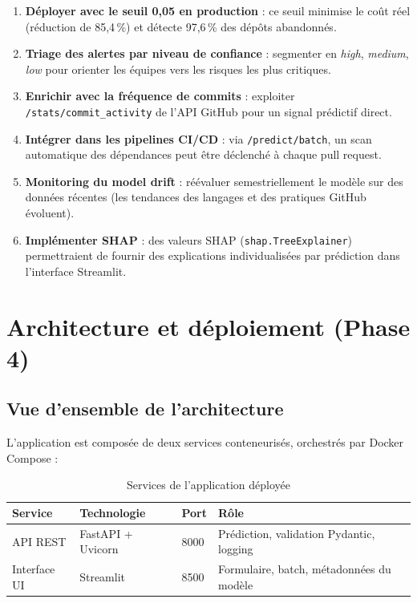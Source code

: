 \documentclass[12pt,a4paper]{article}
\begin{document}
\begin{enumerate}[label=\textbf{R\arabic*.}]
  \item \textbf{Déployer avec le seuil 0,05 en production} : ce seuil minimise le coût réel
    (réduction de 85,4\,\%) et détecte 97,6\,\% des dépôts abandonnés.
  \item \textbf{Triage des alertes par niveau de confiance} : segmenter en \textit{high},
    \textit{medium}, \textit{low} pour orienter les équipes vers les risques les plus critiques.
  \item \textbf{Enrichir avec la fréquence de commits} : exploiter \texttt{/stats/commit\_activity}
    de l'API GitHub pour un signal prédictif direct.
  \item \textbf{Intégrer dans les pipelines CI/CD} : via \texttt{/predict/batch}, un scan
    automatique des dépendances peut être déclenché à chaque pull request.
  \item \textbf{Monitoring du model drift} : réévaluer semestriellement le modèle sur des
    données récentes (les tendances des langages et des pratiques GitHub évoluent).
  \item \textbf{Implémenter SHAP} : des valeurs SHAP (\texttt{shap.TreeExplainer}) permettraient
    de fournir des explications individualisées par prédiction dans l'interface Streamlit.
\end{enumerate}

\newpage
\section{Architecture et déploiement (Phase 4)}

\subsection{Vue d'ensemble de l'architecture}

L'application est composée de deux services conteneurisés, orchestrés par Docker Compose :

\begin{table}[H]
  \centering
  \caption{Services de l'application déployée}
  \label{tab:services}
  \begin{tabularx}{\linewidth}{lllL}
    \toprule
    \textbf{Service} & \textbf{Technologie} & \textbf{Port} & \textbf{Rôle} \\
    \midrule
    API REST & FastAPI + Uvicorn & 8000 & Prédiction, validation Pydantic, logging \\
    Interface UI & Streamlit & 8500 & Formulaire, batch, métadonnées du modèle \\
    \bottomrule
  \end{tabularx}
\end{table}
\end{document}
